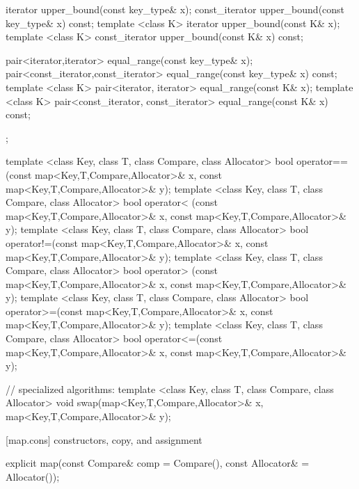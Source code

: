\begin{codeblock}
{{    iterator       upper_bound(const key_type& x);
    const_iterator upper_bound(const key_type& x) const;
    template <class K> iterator       upper_bound(const K& x);
    template <class K> const_iterator upper_bound(const K& x) const;

    pair<iterator,iterator>
      equal_range(const key_type& x);
    pair<const_iterator,const_iterator>
      equal_range(const key_type& x) const;
    template <class K>
      pair<iterator, iterator>             equal_range(const K& x);
    template <class K>
      pair<const_iterator, const_iterator> equal_range(const K& x) const;
  };

  template <class Key, class T, class Compare, class Allocator>
    bool operator==(const map<Key,T,Compare,Allocator>& x,
                    const map<Key,T,Compare,Allocator>& y);
  template <class Key, class T, class Compare, class Allocator>
    bool operator< (const map<Key,T,Compare,Allocator>& x,
                    const map<Key,T,Compare,Allocator>& y);
  template <class Key, class T, class Compare, class Allocator>
    bool operator!=(const map<Key,T,Compare,Allocator>& x,
                    const map<Key,T,Compare,Allocator>& y);
  template <class Key, class T, class Compare, class Allocator>
    bool operator> (const map<Key,T,Compare,Allocator>& x,
                    const map<Key,T,Compare,Allocator>& y);
  template <class Key, class T, class Compare, class Allocator>
    bool operator>=(const map<Key,T,Compare,Allocator>& x,
                    const map<Key,T,Compare,Allocator>& y);
  template <class Key, class T, class Compare, class Allocator>
    bool operator<=(const map<Key,T,Compare,Allocator>& x,
                    const map<Key,T,Compare,Allocator>& y);

  // specialized algorithms:
  template <class Key, class T, class Compare, class Allocator>
    void swap(map<Key,T,Compare,Allocator>& x,
              map<Key,T,Compare,Allocator>& y);
}
\end{codeblock}


[map.cons]{ constructors, copy, and assignment}%
%

%
%
\begin{itemdecl}
explicit map(const Compare& comp = Compare(),
             const Allocator& = Allocator());
\end{itemdecl}

